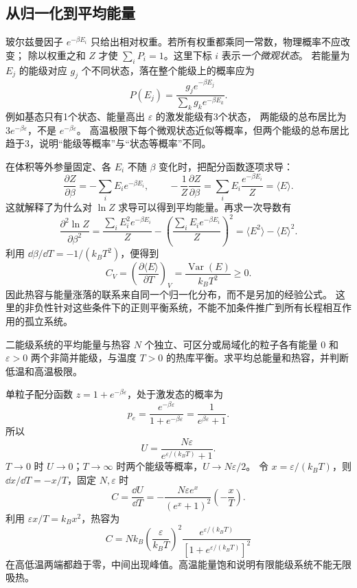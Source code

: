\subsection{从归一化到平均能量}

玻尔兹曼因子 $e^{-\beta E_i}$ 只给出相对权重。若所有权重都乘同一常数，物理概率不应改变；
除以权重之和 $Z$ 才使 $\sum_iP_i=1$。这里下标 $i$ 表示\emph{一个微观状态}。
若能量为 $E_j$ 的能级对应 $g_j$ 个不同状态，落在整个能级上的概率应为
\[
 P(E_j)=\frac{g_je^{-\beta E_j}}{\sum_kg_ke^{-\beta E_k}}.
\]
例如基态只有1个状态、能量高出 $\varepsilon$ 的激发能级有3个状态，
两能级的总布居比为 $3e^{-\beta\varepsilon}$，不是 $e^{-\beta\varepsilon}$。
高温极限下每个微观状态近似等概率，但两个能级的总布居比趋于3，说明“能级等概率”与“状态等概率”不同。

在体积等外参量固定、各 $E_i$ 不随 $\beta$ 变化时，把配分函数逐项求导：
\[
 \frac{\partial Z}{\partial\beta}=-\sum_iE_ie^{-\beta E_i},\qquad
 -\frac1Z\frac{\partial Z}{\partial\beta}
 =\sum_iE_i\frac{e^{-\beta E_i}}Z=\langle E\rangle.
\]
这就解释了为什么对 $\ln Z$ 求导可以得到平均能量。再求一次导数有
\[
 \frac{\partial^2\ln Z}{\partial\beta^2}
 =\frac{\sum_iE_i^2e^{-\beta E_i}}Z
 -\left(\frac{\sum_iE_ie^{-\beta E_i}}Z\right)^2
 =\langle E^2\rangle-\langle E\rangle^2.
\]
利用 $\dd\beta/\dd T=-1/(k_BT^2)$，便得到
\[
 C_V=\left(\frac{\partial\langle E\rangle}{\partial T}\right)_V
 =\frac{\operatorname{Var}(E)}{k_BT^2}\ge0.
\]
因此热容与能量涨落的联系来自同一个归一化分布，而不是另加的经验公式。
这里的非负性针对这些条件下的正则平衡系统，不能不加条件推广到所有长程相互作用的孤立系统。

\begin{origexamplebox}{二能级系统的平均能量与热容}
$N$ 个独立、可区分或局域化的粒子各有能量 $0$ 和 $\varepsilon>0$ 两个非简并能级，与温度 $T>0$ 的热库平衡。求平均总能量和热容，并判断低温和高温极限。
\end{origexamplebox}
\begin{xesolution}
单粒子配分函数 $z=1+e^{-\beta\varepsilon}$，处于激发态的概率为
\[
 p_e=\frac{e^{-\beta\varepsilon}}{1+e^{-\beta\varepsilon}}
 =\frac1{e^{\beta\varepsilon}+1}.
\]
所以
\[
 \boxed{U=\frac{N\varepsilon}{e^{\varepsilon/(k_BT)}+1}}.
\]
$T\to0$ 时 $U\to0$；$T\to\infty$ 时两个能级等概率，$U\to N\varepsilon/2$。
令 $x=\varepsilon/(k_BT)$，则 $\dd x/\dd T=-x/T$，固定 $N,\varepsilon$ 时
\[ C=\frac{\dd U}{\dd T}
=-\frac{N\varepsilon e^x}{(e^x+1)^2}\left(-\frac{x}{T}\right).\]
利用 $\varepsilon x/T=k_Bx^2$，热容为
\[
 C=Nk_B\left(\frac{\varepsilon}{k_BT}\right)^2
 \frac{e^{\varepsilon/(k_BT)}}{[1+e^{\varepsilon/(k_BT)}]^2}
\]
在高低温两端都趋于零，中间出现峰值。高温能量饱和说明有限能级系统不能无限吸热。
\end{xesolution}

